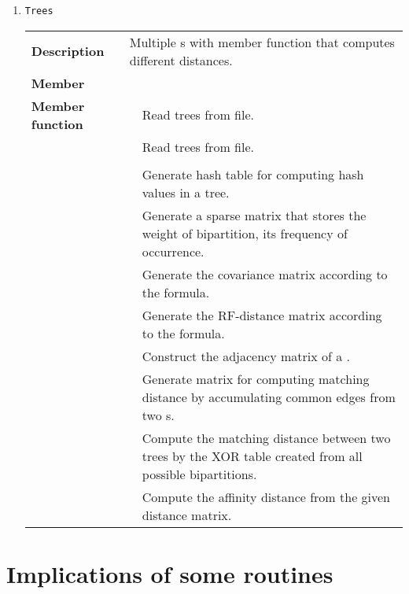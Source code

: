 \documentclass[11pt,a4paper]{article}
\newcommand{\myuline}[1]{%
	\uline{\phantom{#1}}%
	\llap{\contour{white}{#1}}%
}
\newcommand{\mrref}[1]{\texttt{#1}\label{#1}}
\newcommand{\rref}[1]{\hyperref[#1]{\textcolor{blue}{\myuline{\texttt{#1}}}}}
\newcommand{\tref}[2]{\hyperref[#2]{\textcolor{blue}{\myuline{\texttt{#1}}}}}
\theoremstyle{definition}
\theoremstyle{definition}
\numberwithin{equation}{section}
\begin{document}
\begin{enumerate}
		\item \mrref{Trees}
		
			\begin{tabular}{>{\bfseries}lp{0.3\textwidth}p{}}
				Description & \multicolumn{2}{p{0.6\textwidth}}{Multiple \rref{NEWICKTREE}s with member function that computes different distances.} \\
				Member &   & \\
				Member function & \rref{initialTrees} & Read trees from file. \\
				& \rref{ReadTrees} & Read trees from file. \\
				& \tref{compute\_numofbipart}{computenumofbipart} & \\
				& \tref{Compute\_Hash}{ComputeHash} & Generate hash table for computing hash values in a tree.\\
				& \tref{Compute\_Bipart\_Matrix}{ComputeBipartMatrix} & Generate a sparse matrix that stores the weight of bipartition, its frequency of occurrence.\\
				& \tref{Compute\_Bipart\_Covariance}{ComputeBipartCovariance} & Generate the covariance matrix according to the formula.\\
				& \tref{Compute\_RF\_dist\_by\_hash}{ComputeRFdistbyhash} & Generate the RF-distance matrix according to the formula.\\
				& \rref{pttree} & Construct the adjacency matrix of a \rref{Ptree}.\\
				& \tref{compute\_matrix}{computematrix} & Generate matrix for computing matching distance by accumulating common edges from two \rref{Ptree}s.\\
				& \tref{Compute\_Matching\_dist}{ComputeMatchingdist} & Compute the matching distance between two trees by the XOR table created from all possible bipartitions.\\ 
				& \tref{Compute\_Affinity\_dist}{ComputeAffinitydist} & Compute the affinity distance from the given distance matrix.\\
			\end{tabular}
	
		
	\end{enumerate}

	
	\section*{Implications of some routines}
	
\end{document}
